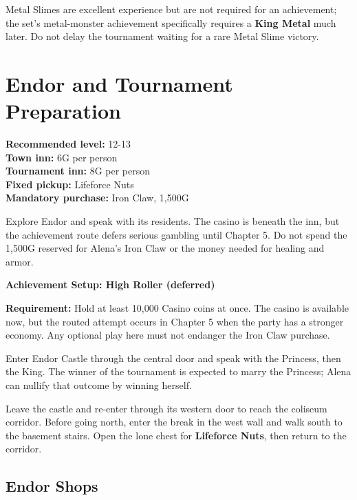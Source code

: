 \documentclass[
  american,
  10pt,
  letterpaper,
  oneside,
  open=any]{scrreprt}
\begin{document}
Metal Slimes are excellent experience but are not required for an
achievement; the set's metal-monster achievement specifically requires a
\textbf{King Metal} much later. Do not delay the tournament waiting for
a rare Metal Slime victory.

\section{Endor and Tournament
Preparation}\label{endor-and-tournament-preparation}

\textbf{Recommended level:} 12-13\\
\textbf{Town inn:} 6G per person\\
\textbf{Tournament inn:} 8G per person\\
\textbf{Fixed pickup:} Lifeforce Nuts\\
\textbf{Mandatory purchase:} Iron Claw, 1,500G

Explore Endor and speak with its residents. The casino is beneath the
inn, but the achievement route defers serious gambling until Chapter 5.
Do not spend the 1,500G reserved for Alena's Iron Claw or the money
needed for healing and armor.

\begin{achievementsetup}

\textbf{Achievement Setup: High Roller (deferred)}

\textbf{Requirement:} Hold at least 10,000 Casino coins at once. The
casino is available now, but the routed attempt occurs in Chapter 5 when
the party has a stronger economy. Any optional play here must not
endanger the Iron Claw purchase.

\end{achievementsetup}

Enter Endor Castle through the central door and speak with the Princess,
then the King. The winner of the tournament is expected to marry the
Princess; Alena can nullify that outcome by winning herself.

Leave the castle and re-enter through its western door to reach the
coliseum corridor. Before going north, enter the break in the west wall
and walk south to the basement stairs. Open the lone chest for
\textbf{Lifeforce Nuts}, then return to the corridor.

\subsection{Endor Shops}\label{endor-shops}
\end{document}
